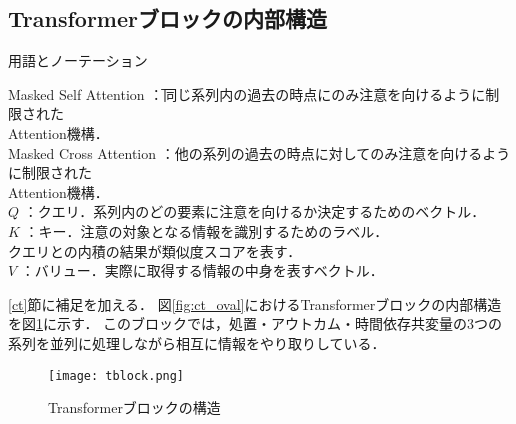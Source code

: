 \documentclass[dvipdfmx]{jreport}
\begin{document}
\subsection{Transformerブロックの内部構造}
\begin{itembox}[l]{\large{用語とノーテーション}}
    \begin{tabbing}
        \hspace{15pt} \raisebox{0.5ex}{\tiny $\bullet$} Masked Self Attention \hspace{6.5pt}\=：同じ系列内の過去の時点にのみ注意を向けるように制限された\\[0.5em]\>\hspace{6.5pt}Attention機構．\\[0.5em]
        \hspace{15pt} \raisebox{0.5ex}{\tiny $\bullet$} Masked Cross Attention \>：他の系列の過去の時点に対してのみ注意を向けるように制限された\\[0.5em]\>\hspace{6.5pt}Attention機構．\\[0.5em]
        \hspace{15pt} \raisebox{0.5ex}{\tiny $\bullet$} $Q$ \>：クエリ．系列内のどの要素に注意を向けるか決定するためのベクトル．\\[0.5em]
        \hspace{15pt} \raisebox{0.5ex}{\tiny $\bullet$} $K$ \>：キー．注意の対象となる情報を識別するためのラベル．\\[0.5em]\>\hspace{6.5pt}クエリとの内積の結果が類似度スコアを表す．\\[0.5em]
        \hspace{15pt} \raisebox{0.5ex}{\tiny $\bullet$} $V$ \>：バリュー．実際に取得する情報の中身を表すベクトル．
    \end{tabbing}
\end{itembox}

\ref{ct}節に補足を加える．
図\ref{fig:ct_oval}におけるTransformerブロックの内部構造を図\ref{fig:t_bl}に示す．
このブロックでは，処置・アウトカム・時間依存共変量の3つの系列を並列に処理しながら相互に情報をやり取りしている．

\begin{figure}[h]
    \begin{center}
        \texttt{[image: tblock.png]} 
        \caption{Transformerブロックの構造} \label{fig:t_bl}
    \end{center}
\end{figure}
\end{document}
